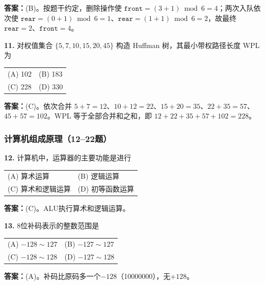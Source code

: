 \ifshowsolutions\par\noindent\textbf{答案：}(B)。按题干约定，删除操作使 $\texttt{front}=(3+1)\bmod6=4$；两次入队依次使 $\texttt{rear}=(0+1)\bmod6=1$、$\texttt{rear}=(1+1)\bmod6=2$，故最终 $\texttt{rear}=2$、$\texttt{front}=4$。\else \answerarea \fi

\vspace{6pt}

\noindent\textbf{11.} 对权值集合 $\{5,7,10,15,20,45\}$ 构造 Huffman 树，其最小带权路径长度 WPL 为
\begin{center}
\begin{tabular}{ll}
(A) 102 & (B) 183 \\[6pt]
(C) 228 & (D) 330
\end{tabular}
\end{center}

\ifshowsolutions\par\noindent\textbf{答案：}(C)。依次合并 $5+7=12$、$10+12=22$、$15+20=35$、$22+35=57$、$45+57=102$。WPL 等于全部合并和之和，即 $12+22+35+57+102=228$。\else \answerarea \fi

\subsubsection*{计算机组成原理（12--22题）}

\noindent\textbf{12.} 计算机中，运算器的主要功能是进行
\begin{center}
\begin{tabular}{ll}
(A) 算术运算 & (B) 逻辑运算 \\[6pt]
(C) 算术和逻辑运算 & (D) 初等函数运算
\end{tabular}
\end{center}

\ifshowsolutions\par\noindent\textbf{答案：}(C)。ALU执行算术和逻辑运算。\else \answerarea \fi

\vspace{6pt}

\noindent\textbf{13.} 8位补码表示的整数范围是
\begin{center}
\begin{tabular}{ll}
(A) $-128\sim127$ & (B) $-127\sim127$ \\[6pt]
(C) $-128\sim128$ & (D) $-127\sim128$
\end{tabular}
\end{center}

\ifshowsolutions\par\noindent\textbf{答案：}(A)。补码比原码多一个$-128$（10000000），无$+128$。\else \answerarea \fi

